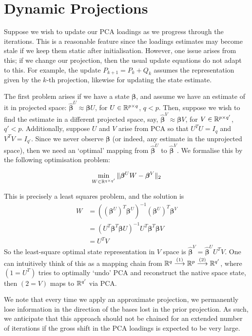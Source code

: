 \section{Dynamic Projections}
Suppose we wish to update our PCA loadings as we progress through the iterations. This is a reasonable feature since the loadings estimates may become stale if we keep them static after initialisation. However, one issue arises from this; if we change our projection, then the usual update equations do not adapt to this. For example, the update $P_{k+1}=P_k+Q_k$ assumes the representation given by the $k$-th projection, likewise for updating the state estimate. 

The first problem arises if we have a state $\bm{\beta}$, and assume we have an estimate of it in projected space: $\hat{\bm{\beta}}^U \approx \bm{\beta}U$, for $U \in \mathbb{R}^{p \times q}$, $q<p$. Then, suppose we wish to find the estimate in a different projected space, say, $\hat{\bm{\beta}}^V \approx \bm{\beta}V$, for $V\in \mathbb{R}^{p \times q'}$, $q' < p$. Additionally, suppose $U$ and $V$ arise from PCA so that $U^TU = I_q$ and $V^T V = I_{q'}$. Since we never observe $\bm{\beta}$ (or indeed, any estimate in the unprojected space), then we need an `optimal' mapping from $\hat{\bm{\beta}}^U$ to $\hat{\bm{\beta}}^V$. We formalise this by the following optimisation problem:

\[
\min_{W\in \mathbb{R}^{q\times q'}}\|\bm{\beta}^UW-\bm{\beta}^V\|_2    
\]

This is precisely a least squares problem, and the solution is 
\begin{align*}
    W &= ((\bm{\beta}^U)^T\bm{\beta}^U)^{-1}(\bm{\beta}^U)^T \bm{\beta}^V \\
    &= (U^T \bm{\beta}^T \bm{\beta} U)^{-1} U^T \bm{\beta}^T\bm{\beta} V \\
    &= U^T V
\end{align*}
So the least-square optimal state representation in $V$ space is $\hat{\bm{\beta}}^V = \bm{\hat{\beta}}^U U^T V$. One can intuitively think of this as a mapping chain from $\mathbb{R}^q \stackrel{(1)}{\longrightarrow} \mathbb{R}^p \stackrel{(2)}{\longrightarrow} \mathbb{R}^{q'}$, where $(1=U^T)$ tries to optimally `undo' PCA and reconstruct the native space state, then $(2=V)$ maps to $\mathbb{R}^{q'}$ via PCA.

We note that every time we apply an approximate projection, we permanently lose information in the direction of the bases lost in the prior projection. As such, we anticipate that this approach should not be chained for an extended number of iterations if the gross shift in the PCA loadings is expected to be very large.
